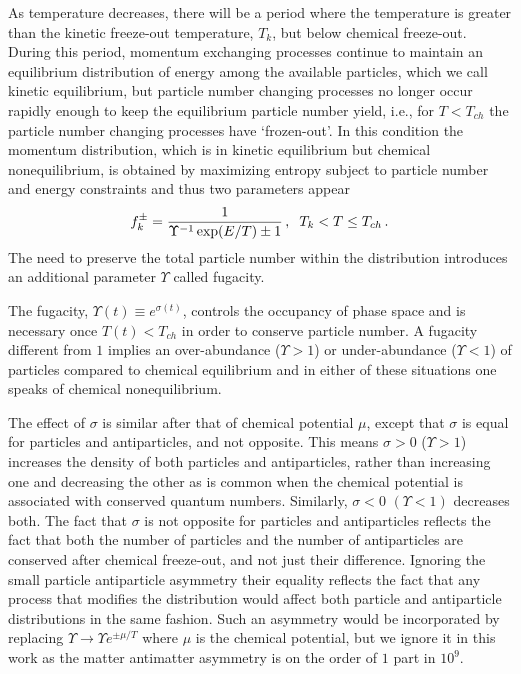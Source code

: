 As temperature decreases, there will be a period where the temperature is greater than the kinetic freeze-out temperature, $T_k$, but below chemical freeze-out. During this period, momentum exchanging processes continue to maintain an equilibrium distribution of energy among the available particles, which we call kinetic equilibrium, but particle number changing processes no longer occur rapidly enough to keep the equilibrium particle number yield, i.e., for $T<T_{ch}$ the particle number changing processes have `frozen-out'. In this condition the momentum distribution, which is in kinetic equilibrium but chemical nonequilibrium, is obtained by maximizing entropy subject to particle number and energy constraints and thus two parameters appear
\begin{equation}\label{eq:kEq}
f_{k}^\pm=\frac{1}{\Upsilon^{-1} \exp(E/T)\pm 1}\,,\hspace{2mm} T_k<T\leq T_{ch}\,.
\end{equation}
The need to preserve the total particle number within the distribution introduces an additional parameter $\Upsilon$ called fugacity. 

The fugacity, $\Upsilon(t)\equiv e^{\sigma(t)}$, controls the occupancy of phase space and is necessary once $T(t)<T_{ch}$ in order to conserve particle number. A fugacity different from $1$ implies an over-abundance ($\Upsilon>1$) or under-abundance ($\Upsilon<1$) of particles compared to chemical equilibrium and in either of these situations one speaks of chemical nonequilibrium. 

The effect of $\sigma$ is similar after that of chemical potential $\mu$, except that $\sigma$ is equal for particles and antiparticles, and not opposite. This means $\sigma>0$ ($\Upsilon>1$) increases the density of both particles and antiparticles, rather than increasing one and decreasing the other as is common when the chemical potential is associated with conserved quantum numbers. Similarly, $\sigma<0$ $(\Upsilon<1)$ decreases both. The fact that $\sigma$ is not opposite for particles and antiparticles reflects the fact that both the number of particles and the number of antiparticles are conserved after chemical freeze-out, and not just their difference. Ignoring the small particle antiparticle asymmetry their equality reflects the fact that any process that modifies the distribution would affect both particle and antiparticle distributions in the same fashion. Such an asymmetry would be incorporated by replacing $\Upsilon\rightarrow \Upsilon e^{\pm\mu/T}$ where $\mu$ is the chemical potential, but we ignore it in this work as the matter antimatter asymmetry is on the order of $1$ part in $10^9$.

